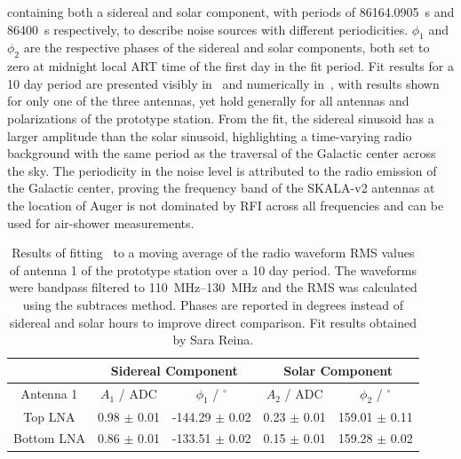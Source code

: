 \noindent
containing both a sidereal and solar component, with periods of \qty{86164.0905}{\second} and \qty{86400}{\second} respectively, to describe noise sources with different periodicities.
$\phi_{1}$ and $\phi_{2}$ are the respective phases of the sidereal and solar components, both set to zero at midnight local ART time of the first day in the fit period.
Fit results for a 10 day period are presented visibly in~ and numerically in~, with results shown for only one of the three antennas, yet hold generally for all antennas and polarizations of the prototype station.
From the fit, the sidereal sinusoid has a larger amplitude than the solar sinusoid, highlighting a time-varying radio background with the same period as the traversal of the Galactic center across the sky.
The periodicity in the noise level is attributed to the radio emission of the Galactic center, proving the frequency band of the SKALA-v2 antennas at the location of Auger is not dominated by RFI across all frequencies and can be used for air-shower measurements. 

\begin{table}
    \caption[Galactic noise fit results to antenna 1 of the IceCube-Gen2 prototype station]{Results of fitting~ to a moving average of the radio waveform RMS values of antenna 1 of the prototype station over a 10 day period. The waveforms were bandpass filtered to \qtyrange{110}{130}{\mega\hertz} and the RMS was calculated using the subtraces method. Phases are reported in degrees instead of sidereal and solar hours to improve direct comparison. Fit results obtained by Sara Reina.}
    \label{tab:gen2_galactic_results}
    \vspace*{.5\baselineskip}
    \centering
    \begin{tabular}{| c || c | c | c | c |}
        \hline
                   & \multicolumn{2}{c|}{Sidereal Component} & \multicolumn{2}{c|}{Solar Component}\\
        \hline
        Antenna 1  & $A_{1}$ / ADC   & $\phi_{1}$ / $^{\circ}$ & $A_{2}$ / ADC   & $\phi_{2}$ / $^{\circ}$\\
        \hline
        \hline
        Top LNA    & 0.98 $\pm$ 0.01 & -144.29 $\pm$ 0.02      & 0.23 $\pm$ 0.01 & 159.01 $\pm$ 0.11\\
        Bottom LNA & 0.86 $\pm$ 0.01 & -133.51 $\pm$ 0.02      & 0.15 $\pm$ 0.01 & 159.28 $\pm$ 0.02\\
        \hline
    \end{tabular}
\end{table}

